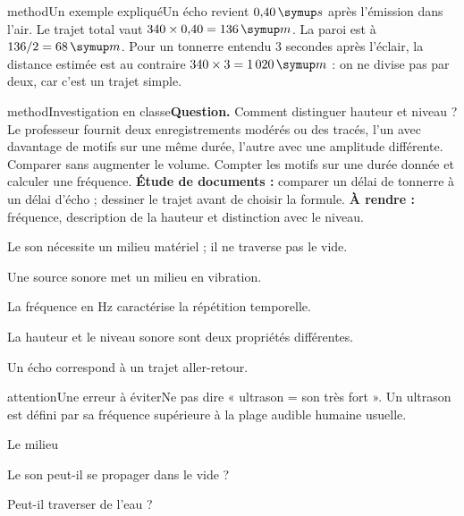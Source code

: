 \begin{pcEncadre}{method}{Un exemple expliqué}Un écho revient $0{,}40\unite s$ après l’émission dans l’air. Le trajet total vaut $340\times0{,}40=136\unite m$. La paroi est à $136/2=68\unite m$. Pour un tonnerre entendu 3 secondes après l’éclair, la distance estimée est au contraire $340\times3=1\,020\unite m$ : on ne divise pas par deux, car c’est un trajet simple.\end{pcEncadre}
\label{activite-19}
\begin{pcEncadre}{method}{Investigation en classe}\textbf{Question.} Comment distinguer hauteur et niveau ? Le professeur fournit deux enregistrements modérés ou des tracés, l’un avec davantage de motifs sur une même durée, l’autre avec une amplitude différente. Comparer sans augmenter le volume. Compter les motifs sur une durée donnée et calculer une fréquence. \textbf{Étude de documents :} comparer un délai de tonnerre à un délai d’écho ; dessiner le trajet avant de choisir la formule. \textbf{À rendre :} fréquence, description de la hauteur et distinction avec le niveau.\end{pcEncadre}
\begin{questions}
\item Le son nécessite un milieu matériel ; il ne traverse pas le vide.
\item Une source sonore met un milieu en vibration.
\item La fréquence en Hz caractérise la répétition temporelle.
\item La hauteur et le niveau sonore sont deux propriétés différentes.
\item Un écho correspond à un trajet aller-retour.
\end{questions}
\begin{pcEncadre}{attention}{Une erreur à éviter}Ne pas dire « ultrason = son très fort ». Un ultrason est défini par sa fréquence supérieure à la plage audible humaine usuelle.\end{pcEncadre}
\pcGrille
\clearpage{}
\par\noindent\begin{minipage}{\linewidth}
\begin{exercice}[1]{Le milieu}
\begin{questions}
\item Le son peut-il se propager dans le vide ?
\item Peut-il traverser de l’eau ?
\end{questions}
\end{exercice}
\end{minipage}
